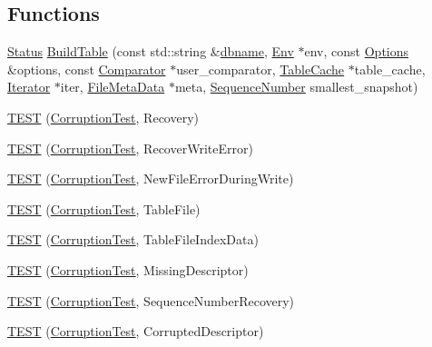 \subsection*{Functions}
\begin{DoxyCompactItemize}
\item 
\hyperlink{classleveldb_1_1_status}{Status} \hyperlink{namespaceleveldb_adadee87d30bdf48c72bcba5fa59102e2}{Build\+Table} (const std\+::string \&\hyperlink{c__test_8c_a75d845559336df6843f3b599960f89d2}{dbname}, \hyperlink{classleveldb_1_1_env}{Env} $\ast$env, const \hyperlink{structleveldb_1_1_options}{Options} \&options, const \hyperlink{structleveldb_1_1_comparator}{Comparator} $\ast$user\+\_\+comparator, \hyperlink{classleveldb_1_1_table_cache}{Table\+Cache} $\ast$table\+\_\+cache, \hyperlink{classleveldb_1_1_iterator}{Iterator} $\ast$iter, \hyperlink{structleveldb_1_1_file_meta_data}{File\+Meta\+Data} $\ast$meta, \hyperlink{namespaceleveldb_a5481ededd221c36d652c371249f869fa}{Sequence\+Number} smallest\+\_\+snapshot)
\item 
\hyperlink{namespaceleveldb_a46326658ffc04dd7509c4066082edb1f}{T\+E\+S\+T} (\hyperlink{classleveldb_1_1_corruption_test}{Corruption\+Test}, Recovery)
\item 
\hyperlink{namespaceleveldb_a22ecc0fbc7435947076320655c5e0265}{T\+E\+S\+T} (\hyperlink{classleveldb_1_1_corruption_test}{Corruption\+Test}, Recover\+Write\+Error)
\item 
\hyperlink{namespaceleveldb_a25dbda5a48ec782778d331e4ccb81b6b}{T\+E\+S\+T} (\hyperlink{classleveldb_1_1_corruption_test}{Corruption\+Test}, New\+File\+Error\+During\+Write)
\item 
\hyperlink{namespaceleveldb_a1da99cee14629599882010198aabfa2a}{T\+E\+S\+T} (\hyperlink{classleveldb_1_1_corruption_test}{Corruption\+Test}, Table\+File)
\item 
\hyperlink{namespaceleveldb_acdfa0365a941e8e01531a402e53ad325}{T\+E\+S\+T} (\hyperlink{classleveldb_1_1_corruption_test}{Corruption\+Test}, Table\+File\+Index\+Data)
\item 
\hyperlink{namespaceleveldb_a6214e0d0ebfaf716601f7a9571aa09ca}{T\+E\+S\+T} (\hyperlink{classleveldb_1_1_corruption_test}{Corruption\+Test}, Missing\+Descriptor)
\item 
\hyperlink{namespaceleveldb_acc1b0ed2e8e9e4e6b930a1727d9fe0f8}{T\+E\+S\+T} (\hyperlink{classleveldb_1_1_corruption_test}{Corruption\+Test}, Sequence\+Number\+Recovery)
\item 
\hyperlink{namespaceleveldb_ab52c022fc16dd83fe1c1c60745c9557c}{T\+E\+S\+T} (\hyperlink{classleveldb_1_1_corruption_test}{Corruption\+Test}, Corrupted\+Descriptor)

\end{DoxyCompactItemize}
